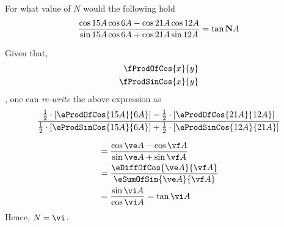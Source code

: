 

\ADD\va\vb\ve
\ADD\vc\vd\vf
\SUBTRACT\vf\ve\vg
\ABSVALUE\vg\vh
\DIVIDE{}\vi

\question[4] For what value of $N$ would the following hold 
  \[\dfrac{\cos{15A}\cos{6A}-\cos{21A}\cos{12A}}{\sin{15A}\cos{6A}+\cos{21A}\sin{12A}} = \tan{\textbf{N}A}\]
\watchout
\begin{solution}[\halfpage]
	Given that,
	\begin{align}
		\fProdOfCos{x}{y} \\
		\fProdSinCos{x}{y}
     \end{align}
     , one can \textit{re-write} the above expression as 
   \[\dfrac{\frac{1}{2}\cdot\left[\eProdOfCos{\va A}{\vb A}\right]-\frac{1}{2}\cdot\left[\eProdOfCos{\vc A}{\vd A}\right]}
     	{\frac{1}{2}\cdot\left[\eProdSinCos{\va A}{\vb A}\right] + \frac{1}{2}\cdot\left[\eProdSinCos{\vd A}{\vc A}\right]}\]

     \begin{align}
     	&= \dfrac{\cos \ve A - \cos \vf A}{\sin \ve A + \sin \vf A} \\
     	&= \dfrac{\eDiffOfCos{\ve A}{\vf A}}{\eSumOfSin{\ve A}{\vf A}} \\
     	&= \dfrac{\sin \vi A}{\cos \vi A} = \tan \vi A
     \end{align}
     Hence, $N = \vi$.
\end{solution}
